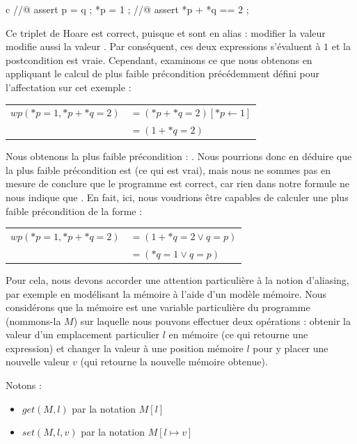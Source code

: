 \begin{CodeBlock}{c}
//@ assert p = q ;
*p = 1 ;
//@ assert *p + *q == 2 ;
\end{CodeBlock}


Ce triplet de Hoare est correct, puisque  et  sont en
alias : modifier la valeur  modifie aussi la valeur .
Par conséquent, ces deux expressions s'évaluent à $1$ et la postcondition est
vraie. Cependant, examinons ce que nous obtenons en appliquant le calcul de plus
faible précondition précédemment défini pour l'affectation sur cet exemple :


\begin{tabular}{ll}
$wp(*p = 1, *p + *q = 2)$ & $= (*p + *q = 2)[*p \leftarrow 1]$\\
                          & $= (1 + *q = 2)$
\end{tabular}


Nous obtenons la plus faible précondition : . Nous
pourrions donc en déduire que la plus faible précondition est 
(ce qui est vrai), mais nous ne sommes pas en mesure de conclure que le programme
est correct, car rien dans notre formule ne nous indique que
. En fait, ici, nous voudrions être capables de
calculer une plus faible précondition de la forme :


\begin{tabular}{ll}
$wp(*p = 1, *p + *q = 2)$ & $= (1 + *q = 2 \vee q = p)$\\
                          & $= (*q = 1 \vee q = p)$
\end{tabular}


Pour cela, nous devons accorder une attention particulière à la notion d'aliasing,
par exemple en modélisant la mémoire à l'aide d'un modèle mémoire. Nous
considérons que la mémoire est une variable particulière du programme (nommons-la
$M$) sur laquelle nous pouvons effectuer deux opérations : obtenir la valeur
d'un emplacement particulier $l$ en mémoire (ce qui retourne une expression) et
changer la valeur à une position mémoire $l$ pour y placer une nouvelle valeur
$v$ (qui retourne la nouvelle mémoire obtenue).


Notons :


\begin{itemize}
\item $get(M,l)$ par la notation $M[l]$
\item $set(M,l,v)$ par la notation $M[l \mapsto v]$
\end{itemize}


